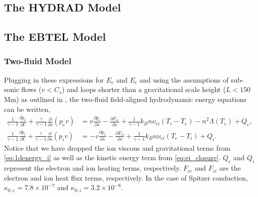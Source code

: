 \subsection{The HYDRAD Model}\label{sec:hydrad}


\subsection{The EBTEL Model}\label{sec:ebtel}


\subsubsection{Two-fluid Model}\label{sec:ebtel-two-fluid}


Plugging in these expressions for $E_e$ and $E_i$ and using the assumptions of sub-sonic flows ($v<C_s$) and loops shorter than a gravitational scale height ($L<150$ Mm) as outlined in \citet{klimchuk_highly_2008}, the two-fluid field-aligned hydrodynamic energy equations can be written,
\begin{align}
    \frac{1}{\gamma - 1}\frac{\partial p_e}{\partial t} + \frac{\gamma}{\gamma - 1}\frac{\partial}{\partial s}(p_ev) &= v\frac{\partial p_e}{\partial s} - \frac{\partial F_{ce}}{\partial s} + \frac{1}{\gamma - 1}k_Bn\nu_{ei}(T_i-T_e) -n^2\Lambda(T_e)+Q_{e}, \label{eq:1denergy_e_simp} \\[0.5em]
    \frac{1}{\gamma - 1}\frac{\partial p_i}{\partial t} + \frac{\gamma}{\gamma - 1}\frac{\partial }{\partial s}(p_iv)&= -v\frac{\partial p_e}{\partial s} - \frac{\partial F_{ci}}{\partial s} + \frac{1}{\gamma - 1}k_Bn\nu_{ei}(T_e-T_i) + Q_{i}. \label{eq:1denergy_i_simp}
\end{align}
Notice that we have dropped the ion viscous and gravitational terms from  \autoref{eq:1denergy_i} as well as the kinetic energy term from \autoref{eq:ei_closure}. $Q_{e}$ and $Q_{i}$ represent the electron and ion heating terms, respectively. $F_{ce}$ and $F_{ci}$ are the electron and ion heat flux terms, respectively. In the case of Spitzer conduction, $\kappa_{0,e}=7.8\times10^{-7}$ and $\kappa_{0,i}=3.2\times10^{-8}$.


